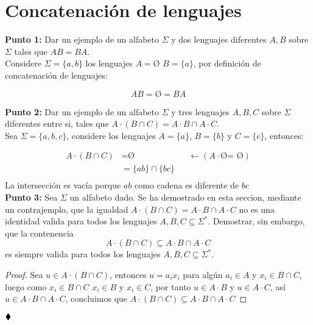 \section{Concatenación de lenguajes} 

\textbf{Punto 1: }Dar un ejemplo de un alfabeto $\Sigma$ y dos lenguajes diferentes $A,B$ sobre $\Sigma$ tales que $AB=BA.$\\ 

Considere $\displaystyle\Sigma=\{a,b\}$ los lenguajes $A=$\O {} $B=\{a\}$, por definición de concatenación de lenguajes:

$$AB=\text{\O}=BA$$

\textbf{Punto 2: }Dar un ejemplo de un alfabeto $\Sigma$ y tres lenguajes $A,B,C$ sobre $\Sigma$ diferentes entre si, tales que $A\cdot(B\cap C)=A\cdot B\cap A\cdot C.$\\

 Sea $\displaystyle\Sigma=\{a,b,c\}$, considere los lenguajes $A=\{a\}$, $B=\{b\}$ y $C=\{c\}$, entonces:

\begin{align*}
    A\cdot(B\cap C)&=\text{\O}  &&\longleftarrow(A\cdot \text{\O = \O})\\
    &=\{ab\}\cap\{bc\}\\
\end{align*}
La intersección es vacía porque $ab$ como cadena es diferente de $bc$\\

\textbf{Punto 3: }Sea $\Sigma$ un alfabeto dado. Se ha demostrado en esta seccion, mediante un contrajemplo, que la igualdad  $A\cdot(B\cap C)=A\cdot B\cap A\cdot C$ no es una identidad valida para todos los lenguajes $A,B,C\subseteq \Sigma^*.$ Demostrar, sin embargo, que la contenencia
$$A\cdot(B\cap C)\subseteq A\cdot B\cap A\cdot C$$
es siempre valida para todos los lenguajes $A,B,C\subseteq \Sigma^*.$

\begin{proof}
Sea $u\in A\cdot(B\cap C)$, entonces $u=a_ix_i$ para algún $a_i\in A$ y $x_i \in B\cap C$, luego como $x_i\in B\cap C$ $x_i\in B$ y $x_i \in C$, por tanto $u \in A\cdot B$ y $u\in A\cdot C$, así $u\in A\cdot B \cap A\cdot C$, concluimos que $A \cdot(B \cap C) \subseteq A \cdot B \cap A \cdot C$

\end{proof}


$\hfill \blacklozenge$

